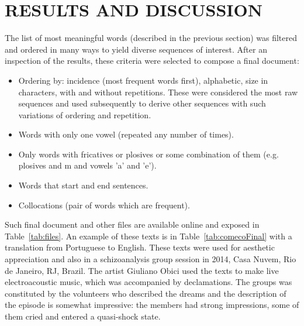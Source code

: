 \documentclass[12pt,fleqn]{article}
\begin{document}
\section{RESULTS AND DISCUSSION}
The list of most meaningful words (described in the previous section) was filtered and ordered
in many ways to yield diverse sequences of interest.
After an inspection of the results, these criteria were selected to compose a final document:
\begin{itemize}
	\item Ordering by: incidence (most frequent words first),
alphabetic, size in characters, with and without repetitions.
These were considered the most raw sequences and used subsequently to derive other sequences
		with such variations of ordering and repetition.
	\item Words with only one vowel (repeated any number of times).
	\item Only words with fricatives or plosives or
some combination of them (e.g. plosives and m and vowels 'a' and 'e').
	\item Words that start and end sentences.
	\item Collocations (pair of words which are frequent).
\end{itemize}

Such final document and other files are available online and exposed in Table~\ref{tab:files}.
An example of these texts is in Table~\ref{tab:comecoFinal} with a translation
from Portuguese to English.
These texts were used for aesthetic appreciation and also in a schizoanalysis group session
in 2014, Casa Nuvem, Rio de Janeiro, RJ, Brazil.
The artist Giuliano Obici used the texts to make live electroacoustic music,
which was accompanied by declamations.
The groups was constituted by the volunteers who described the dreams and
the description of the episode is somewhat impressive:
the members had strong impressions, some of them cried and entered a quasi-shock state. 

\newpage %

\vspace{12cm}
\end{document}
